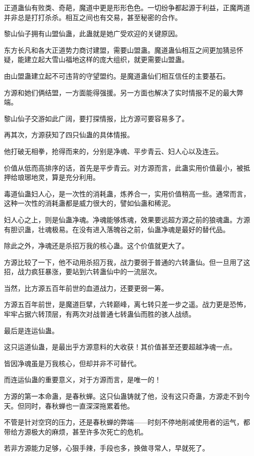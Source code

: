 \begin{this_body}
正道蛊仙有败类、奇葩，魔道中更是形形色色。一切纷争都起源于利益，正魔两道并非总是打打杀杀。相互之间也有交易，甚至秘密的合作。

黎山仙子拥有山盟仙蛊，此蛊就是她广受欢迎的关键原因。

东方长凡和各大正道势力商讨建盟，需要山盟蛊。魔道蛊仙相互之间更加猜忌怀疑，能建立起大雪山福地这样的庞大组织，就更需要山盟蛊。

由山盟蛊建立起不可违背的守望盟约。是魔道蛊仙们相互信任的主要基石。

方源和她们俩结盟，一方面能得强援。另一方面也解决了实时情报不足的最大弊端。

黎山仙子交游如此广阔，要打探情报，比方源可要容易多了。

再其次，方源获知了四只仙蛊的具体情报。

他打破无相拳，抢得而来的，分别是净魂、平步青云、妇人心以及连云。

价值从低而高排序的话，首先是平步青云。对方源而言，此蛊实用价值最小，被抵押给琅琊地灵，算是充分利用。

毒道仙蛊妇人心，是一次性的消耗蛊，炼养合一，实用价值稍高一些。通常而言，这种一次性的消耗蛊都是威力很大的，譬如仙蛊和稀泥。

妇人心之上，则是仙蛊净魂。净魂能够炼魂，效果要远超方源之前的狼魂蛊。方源有胆识蛊，壮魂极易。在没有进入落魄谷之前，仙蛊净魂是最好的替代品。

除此之外，净魂还是杀招万我的核心蛊。这个价值就更大了。

方源比较了一下，他不动用杀招万我，战力要弱于普通的六转蛊仙。但一旦用了这招，战力疯狂暴涨，要站到六转蛊仙中的一流层次。

当然，比方源五百年前世的血道战力，还要更弱一筹。

方源五百年前世，是魔道巨擘，六转巅峰，离七转只差一步之遥。战力更是恐怖，牢牢占据六转顶层，有两次对战普通七转蛊仙而胜的骇人战绩。

最后是连运仙蛊。

这只运道仙蛊，是最出乎方源意料的大收获！其价值甚至还要超越净魂一点。

皆因净魂虽是万我核心，但却并非不可替代。

而连运仙蛊的重要意义，对于方源而言，是唯一的！

方源的第一本命蛊，是春秋蝉。这只仙蛊铸就了他，没有这只奇蛊，方源走不到今天。但同时，春秋蝉也一直深深拖累着他。

不管是针对空窍的压力，还是春秋蝉的弊端——时刻不停地削减使用者的运气，都带给方源极大的麻烦，甚至许多次死亡的危机。

若非方源能力足够，心狠手辣，手段也多，换做寻常人，早就死了。


\end{this_body}
